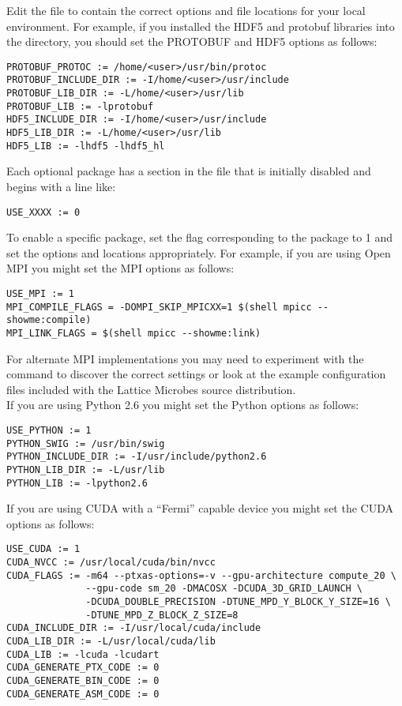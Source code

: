 Edit the  file to contain the correct options and file locations for your local environment. For example, if you installed the HDF5 and protobuf libraries into the  directory, you should set the PROTOBUF and HDF5 options as follows:

{\small\begin{verbatim}
PROTOBUF_PROTOC := /home/<user>/usr/bin/protoc
PROTOBUF_INCLUDE_DIR := -I/home/<user>/usr/include
PROTOBUF_LIB_DIR := -L/home/<user>/usr/lib
PROTOBUF_LIB := -lprotobuf
HDF5_INCLUDE_DIR := -I/home/<user>/usr/include
HDF5_LIB_DIR := -L/home/<user>/usr/lib
HDF5_LIB := -lhdf5 -lhdf5_hl
\end{verbatim}}

Each optional package has a section in the  file that is initially disabled and begins with a line like:
{\small\begin{verbatim}
USE_XXXX := 0
\end{verbatim}}

To enable a specific package, set the flag corresponding to the package to 1 and set the options and locations appropriately. For example, if you are using Open MPI you might set the MPI options as follows:
{\small\begin{verbatim}
USE_MPI := 1
MPI_COMPILE_FLAGS = -DOMPI_SKIP_MPICXX=1 $(shell mpicc --showme:compile)
MPI_LINK_FLAGS = $(shell mpicc --showme:link)
\end{verbatim}}

For alternate MPI implementations you may need to experiment with the  command to discover the correct settings or look at the example configuration files included with the Lattice Microbes source distribution.\\

If you are using Python 2.6 you might set the Python options as follows:
{\small\begin{verbatim}
USE_PYTHON := 1
PYTHON_SWIG := /usr/bin/swig
PYTHON_INCLUDE_DIR := -I/usr/include/python2.6
PYTHON_LIB_DIR := -L/usr/lib
PYTHON_LIB := -lpython2.6
\end{verbatim}}

If you are using CUDA with a ``Fermi'' capable device you might set the CUDA options as follows:
{\small\begin{verbatim}
USE_CUDA := 1
CUDA_NVCC := /usr/local/cuda/bin/nvcc
CUDA_FLAGS := -m64 --ptxas-options=-v --gpu-architecture compute_20 \
              --gpu-code sm_20 -DMACOSX -DCUDA_3D_GRID_LAUNCH \
              -DCUDA_DOUBLE_PRECISION -DTUNE_MPD_Y_BLOCK_Y_SIZE=16 \
              -DTUNE_MPD_Z_BLOCK_Z_SIZE=8
CUDA_INCLUDE_DIR := -I/usr/local/cuda/include
CUDA_LIB_DIR := -L/usr/local/cuda/lib
CUDA_LIB := -lcuda -lcudart
CUDA_GENERATE_PTX_CODE := 0
CUDA_GENERATE_BIN_CODE := 0
CUDA_GENERATE_ASM_CODE := 0
\end{verbatim}}

